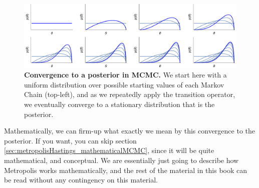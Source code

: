 \documentclass[11pt,fullpage]{book}
\begin{document}
\begin{figure}
\centerline{\includegraphics[width=1.5\textwidth]{metropolisHastings_convergenceToPosterior.pdf}}
\caption{\textbf{Convergence to a posterior in MCMC.} We start here with a uniform distribution over possible starting values of each Markov Chain (top-left), and as we repeatedly apply the transition operator, we eventually converge to a stationary distribution that is the posterior.}\label{fig:metropolisHastings_convergenceToPosterior}
\end{figure}

Mathematically, we can firm-up what exactly we mean by this convergence to the posterior. If you want, you can skip section \ref{sec:metropolisHastings_mathematicalMCMC}, since it will be quite mathematical, and conceptual. We are essentially just going to describe how Metropolis works mathematically, and the rest of the material in this book can be read without any contingency on this material. 
\end{document}
